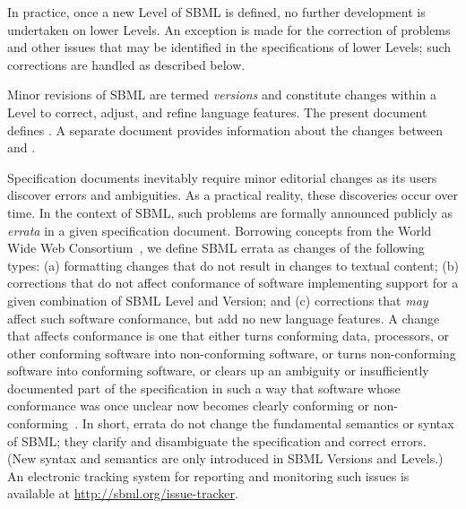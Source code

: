 In practice, once a new Level of SBML is defined, no further
development is undertaken on lower Levels.  An exception is made
for the correction of problems and other issues that may be
identified in the specifications of lower Levels; such corrections
are handled as described below.

Minor revisions of SBML are termed \emph{versions} and constitute
changes within a Level to correct, adjust, and refine language
features.  The present document defines \thisL \emph{\thisV}.  A separate
document provides information about the changes between \sbmlthree
and \sbmltwo.


Specification documents inevitably require minor editorial changes
as its users discover errors and ambiguities.  As a practical
reality, these discoveries occur over time.  In the context of
SBML, such problems are formally announced publicly as
\emph{errata} in a given specification document.  Borrowing
concepts from the World Wide Web Consortium~\citep{jacobs:2004},
we define SBML errata as changes of the following types: (a)
formatting changes that do not result in changes to textual
content; (b) corrections that do not affect conformance of
software implementing support for a given combination of SBML
Level and Version; and (c) corrections that \emph{may} affect such
software conformance, but add no new language features.  A change
that affects conformance is one that either turns conforming data,
processors, or other conforming software into non-conforming
software, or turns non-conforming software into conforming
software, or clears up an ambiguity or insufficiently documented
part of the specification in such a way that software whose
conformance was once unclear now becomes clearly conforming or
non-conforming~\citep{jacobs:2004}.  In short, errata do not
change the fundamental semantics or syntax of SBML; they clarify
and disambiguate the specification and correct errors.  (New
syntax and semantics are only introduced in SBML Versions and
Levels.)  An electronic tracking system for reporting and
monitoring such issues is available at
\url{http://sbml.org/issue-tracker}.

